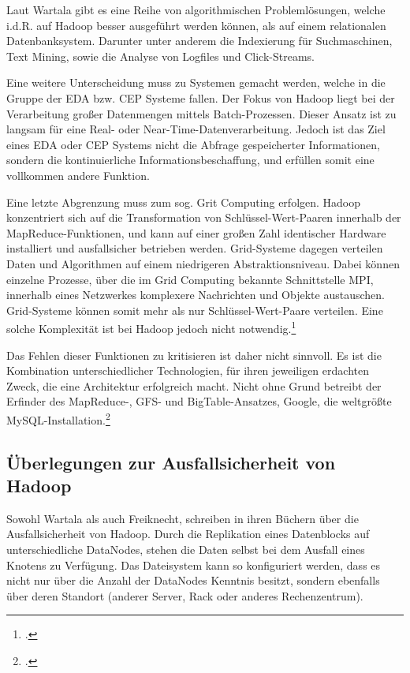 Laut Wartala gibt es eine Reihe von algorithmischen Problemlösungen, welche i.d.R. auf Hadoop besser ausgeführt werden können, als auf einem relationalen Datenbanksystem. Darunter unter anderem die Indexierung für Suchmaschinen, Text Mining, sowie die Analyse von Logfiles und Click-Streams.

Eine weitere Unterscheidung muss zu Systemen gemacht werden, welche in die Gruppe der \ac{EDA} bzw. \ac{CEP} Systeme fallen. Der Fokus von Hadoop liegt bei der Verarbeitung großer Datenmengen mittels Batch-Prozessen. Dieser Ansatz ist zu langsam für eine Real- oder Near-Time-Datenverarbeitung. Jedoch ist das Ziel eines \ac{EDA} oder \ac{CEP} Systems nicht die Abfrage gespeicherter Informationen, sondern die kontinuierliche Informationsbeschaffung, und erfüllen somit eine vollkommen andere Funktion.

Eine letzte Abgrenzung muss zum sog. Grit Computing erfolgen. Hadoop konzentriert sich auf die Transformation von Schlüssel-Wert-Paaren innerhalb der MapReduce-Funktionen, und kann auf einer großen Zahl identischer Hardware installiert und ausfallsicher betrieben werden. Grid-Systeme dagegen verteilen Daten und Algorithmen auf einem niedrigeren Abstraktionsniveau. Dabei können einzelne Prozesse, über die im Grid Computing bekannte Schnittstelle \ac{MPI}, innerhalb eines Netzwerkes komplexere Nachrichten und Objekte austauschen. Grid-Systeme können somit mehr als nur Schlüssel-Wert-Paare verteilen. Eine solche Komplexität ist bei Hadoop jedoch nicht notwendig.\footcite[Vgl.][S. 30-33]{Wartala.2012}

Das Fehlen dieser Funktionen zu kritisieren ist daher nicht sinnvoll. Es ist die Kombination unterschiedlicher Technologien, für ihren jeweiligen erdachten Zweck, die eine Architektur erfolgreich macht. \flqq Nicht ohne Grund betreibt der Erfinder des MapReduce-, \ac{GFS}- und BigTable-Ansatzes, Google, die weltgrößte MySQL-Installation.\frqq\footcite[S. 31]{Wartala.2012}


\subsection{Überlegungen zur Ausfallsicherheit von Hadoop}
Sowohl Wartala als auch Freiknecht, schreiben in ihren Büchern über die Ausfallsicherheit von Hadoop. Durch die Replikation eines Datenblocks auf unterschiedliche DataNodes, stehen die Daten selbst bei dem Ausfall eines Knotens zu Verfügung. Das Dateisystem kann so konfiguriert werden, dass es nicht nur über die Anzahl der DataNodes Kenntnis besitzt, sondern ebenfalls über deren Standort (anderer Server, Rack oder anderes Rechenzentrum).

